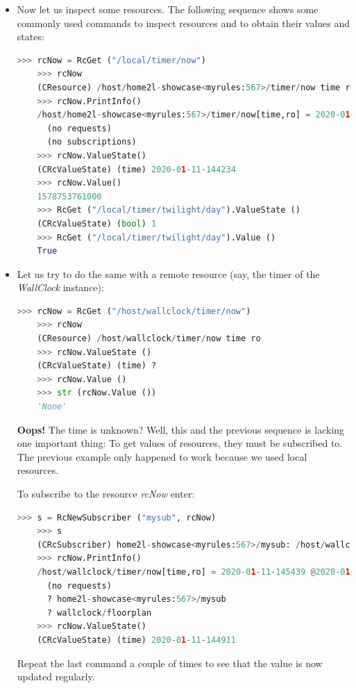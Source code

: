 \documentclass[12pt,english,parskip=half,headheight=19pt]{scrreprt}
\begin{document}
\begin{itemize}[$\blacktriangleright$]

\item
  Now let us inspect some resources. The following sequence shows some commonly used commands to inspect
  resources and to obtain their values and states:
  \begin{lstlisting}[language=python]
    >>> rcNow = RcGet ("/local/timer/now")
    >>> rcNow
    (CResource) /host/home2l-showcase<myrules:567>/timer/now time ro
    >>> rcNow.PrintInfo()
    /host/home2l-showcase<myrules:567>/timer/now[time,ro] = 2020-01-11-150350 @2020-01-11-150350.000
      (no requests)
      (no subscriptions)
    >>> rcNow.ValueState()
    (CRcValueState) (time) 2020-01-11-144234
    >>> rcNow.Value()
    1578753761000
    >>> RcGet ("/local/timer/twilight/day").ValueState ()
    (CRcValueState) (bool) 1
    >>> RcGet ("/local/timer/twilight/day").Value ()
    True
  \end{lstlisting}

\item
  Let us try to do the same with a remote resource (say, the timer of the \textit{WallClock} instance):
  \begin{lstlisting}[language=python]
    >>> rcNow = RcGet ("/host/wallclock/timer/now")
    >>> rcNow
    (CResource) /host/wallclock/timer/now time ro
    >>> rcNow.ValueState ()
    (CRcValueState) (time) ?
    >>> rcNow.Value ()
    >>> str (rcNow.Value ())
    'None'
  \end{lstlisting}
  \textbf{Oops!} The time is unknown? Well, this and the previous sequence is lacking
  one important thing: To get values of resources, they must be subscribed to.
  The previous example only happened to work because we used local resources.

  To subscribe to the resource \textit{rcNow} enter:
  \begin{lstlisting}[language=python]
    >>> s = RcNewSubscriber ("mysub", rcNow)
    >>> s
    (CRcSubscriber) home2l-showcase<myrules:567>/mysub: /host/wallclock/timer/now
    >>> rcNow.PrintInfo()
    /host/wallclock/timer/now[time,ro] = 2020-01-11-145439 @2020-01-11-145439.007
      (no requests)
      ? home2l-showcase<myrules:567>/mysub
      ? wallclock/floorplan
    >>> rcNow.ValueState()
    (CRcValueState) (time) 2020-01-11-144911
  \end{lstlisting}
  Repeat the last command a couple of times to see that the value is now updated regularly.

\end{itemize}
\end{document}
